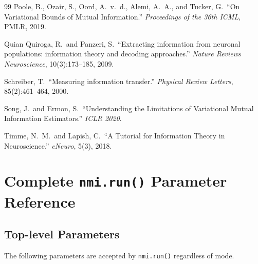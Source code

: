 \documentclass[12pt]{article}
\newcommand{\api}[1]{\texttt{#1}}
\begin{document}
\begin{thebibliography}{99}
Poole, B., Ozair, S., Oord, A.\ v.\ d., Alemi, A.\ A., and Tucker, G.\
``On Variational Bounds of Mutual Information.''
\emph{Proceedings of the 36th ICML}, PMLR, 2019.

Quian Quiroga, R.\ and Panzeri, S.\
``Extracting information from neuronal populations: information theory and
decoding approaches.''
\emph{Nature Reviews Neuroscience}, 10(3):173--185, 2009.

Schreiber, T.\
``Measuring information transfer.''
\emph{Physical Review Letters}, 85(2):461--464, 2000.

Song, J.\ and Ermon, S.\
``Understanding the Limitations of Variational Mutual Information Estimators.''
\emph{ICLR 2020}.

Timme, N.\ M.\ and Lapish, C.\
``A Tutorial for Information Theory in Neuroscience.''
\emph{eNeuro}, 5(3), 2018.

\end{thebibliography}

\appendix

\section{Complete \texttt{nmi.run()} Parameter Reference}
\label{app:run_params}

\subsection{Top-level Parameters}

The following parameters are accepted by \api{nmi.run()} regardless of mode.
\end{document}

